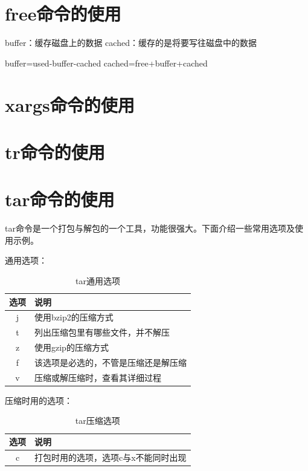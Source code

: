 \section{free命令的使用}
\label{sec:freeCmd}

buffer：缓存磁盘上的数据
cached：缓存的是将要写往磁盘中的数据

buffer=used-buffer-cached
cached=free+buffer+cached

\section{xargs命令的使用}
\label{sec:xargsCmd}

\section{tr命令的使用}
\label{sec:trCmd}

\section{tar命令的使用}
\label{sec:tarCmd}

tar命令是一个打包与解包的一个工具，功能很强大。下面介绍一些常用选项及使
用示例。

通用选项：

\begin{table}[!h]
  \centering
    \begin{tabular}{cl}
      \toprule
      选项     & 说明 \\
      \midrule
      j        & 使用bzip2的压缩方式 \\
      t        & 列出压缩包里有哪些文件，并不解压 \\
      z        & 使用gzip的压缩方式 \\
      f        & 该选项是必选的，不管是压缩还是解压缩 \\
      v        & 压缩或解压缩时，查看其详细过程 \\
      \bottomrule
    \end{tabular}
    \caption{tar通用选项}
    \label{tab:tarGeneralOpt}
\end{table}

压缩时用的选项：

\begin{table}[!h]
  \centering
    \begin{tabular}{cl}
      \toprule
      选项     & 说明 \\
      \midrule
      c        & 打包时用的选项，选项c与x不能同时出现 \\
      \bottomrule
    \end{tabular}
    \caption{tar压缩选项}
    \label{tab:tarCompressOpt}
\end{table}

